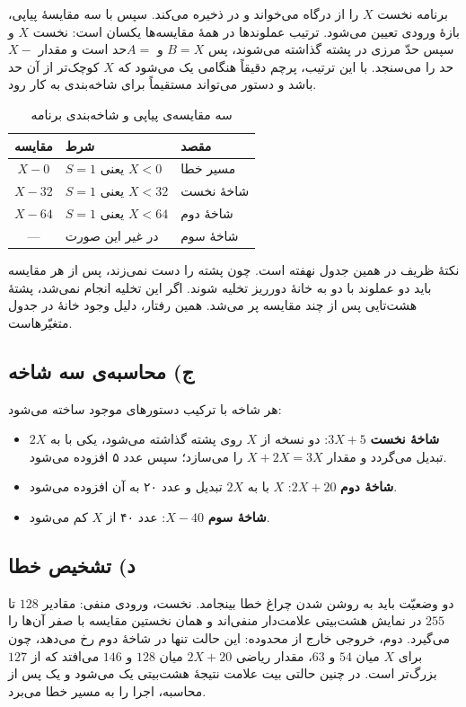 \documentclass[12pt,a4paper]{article}
\begin{document}
	برنامه نخست \(X\) را از درگاه  می‌خواند و در  ذخیره می‌کند. سپس با سه مقایسهٔ پیاپی، بازهٔ ورودی تعیین می‌شود. ترتیب عملوندها در همهٔ مقایسه‌ها یکسان است: نخست \(X\) و سپس حدّ مرزی در پشته گذاشته می‌شوند، پس \(B=X\) و \(A=\)حد است و  مقدار \(X-\)حد را می‌سنجد. با این ترتیب، پرچم  دقیقاً هنگامی یک می‌شود که \(X\) کوچک‌تر از آن حد باشد و دستور  می‌تواند مستقیماً برای شاخه‌بندی به کار رود.

	\begin{table}[H]
		\centering
		\footnotesize
		\begin{tabular}{|c|l|l|}
			\hline
			\textbf{مقایسه} & \textbf{شرط} & \textbf{مقصد} \\ \hline
			\(X - 0\)  & \(S=1\) یعنی \(X<0\)  & مسیر خطا \\ \hline
			\(X - 32\) & \(S=1\) یعنی \(X<32\) & شاخهٔ نخست \\ \hline
			\(X - 64\) & \(S=1\) یعنی \(X<64\) & شاخهٔ دوم \\ \hline
			--- & در غیر این صورت & شاخهٔ سوم \\ \hline
		\end{tabular}
		\caption{سه مقایسه‌ی پیاپی و شاخه‌بندی برنامه}
	\end{table}

	نکتهٔ ظریف در همین جدول نهفته است. چون  پشته را دست نمی‌زند، پس از هر مقایسه باید دو عملوند با دو  به خانهٔ دورریز  تخلیه شوند. اگر این تخلیه انجام نمی‌شد، پشتهٔ هشت‌تایی پس از چند مقایسه پر می‌شد. همین رفتار، دلیل وجود خانهٔ  در جدول متغیّرهاست.

	\subsection*{ج) محاسبه‌ی سه شاخه}
	هر شاخه با ترکیب دستورهای موجود ساخته می‌شود:
	\begin{itemize}
		\item \textbf{شاخهٔ نخست} \(3X+5\): دو نسخه از \(X\) روی پشته گذاشته می‌شود، یکی با  به \(2X\) تبدیل می‌گردد و  مقدار \(X+2X=3X\) را می‌سازد؛ سپس عدد ۵ افزوده می‌شود.
		\item \textbf{شاخهٔ دوم} \(2X+20\): \(X\) با  به \(2X\) تبدیل و عدد ۲۰ به آن افزوده می‌شود.
		\item \textbf{شاخهٔ سوم} \(X-40\): عدد ۴۰ از \(X\) کم می‌شود.
	\end{itemize}

	\subsection*{د) تشخیص خطا}
	دو وضعیّت باید به روشن شدن چراغ خطا بینجامد. نخست، ورودی منفی: مقادیر \(128\) تا \(255\) در نمایش هشت‌بیتی علامت‌دار منفی‌اند و همان نخستین مقایسه با صفر آن‌ها را می‌گیرد. دوم، خروجی خارج از محدوده: این حالت تنها در شاخهٔ دوم رخ می‌دهد، چون برای \(X\) میان \(54\) و \(63\)، مقدار ریاضی \(2X+20\) میان \(128\) و \(146\) می‌افتد که از \(127\) بزرگ‌تر است. در چنین حالتی بیت علامت نتیجهٔ هشت‌بیتی یک می‌شود و یک  پس از محاسبه، اجرا را به مسیر خطا می‌برد.
\end{document}
